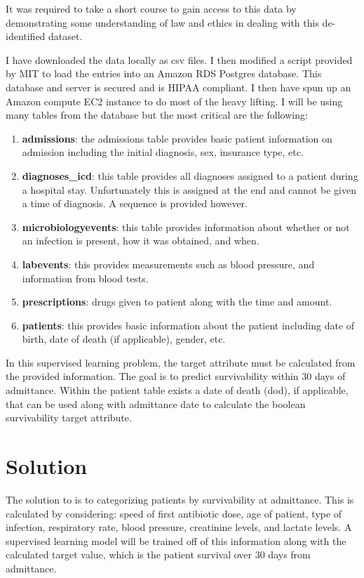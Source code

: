 \documentclass[11pt]{article}
\begin{document}
It was required to take a short course to gain access to this data by demonstrating some understanding of law and ethics in dealing with this de-identified dataset.

I have downloaded the data locally as csv files. I then modified a script provided by MIT to load the entries into an Amazon RDS Postgres database. This database and server is secured and is HIPAA compliant. I then have spun up an Amazon compute EC2 instance to do most of the heavy lifting. I will be using many tables from the database but the most critical are the following:
\begin{enumerate}
\item \textbf{admissions}: the admissions table provides basic patient information on admission including the initial diagnosis, sex, insurance type, etc.
\item \textbf{diagnoses\_icd}: this table provides all diagnoses assigned to a patient during a hospital stay. Unfortunately this is assigned at the end and cannot be given a time of diagnosis. A sequence is provided however.
\item \textbf{microbiologyevents}: this table provides information about whether or not an infection is present, how it was obtained, and when.
\item \textbf{labevents}: this provides measurements such as blood pressure, and information from blood tests.
\item \textbf{prescriptions}: drugs given to patient along with the time and amount.
\item \textbf{patients}: this provides basic information about the patient including date of birth, date of death (if applicable), gender, etc.
\end{enumerate}

In this supervised learning problem, the target attribute must be calculated from the provided information. The goal is to predict survivability within 30 days of admittance. Within the patient table exists a date of death (dod), if applicable, that can be used along with admittance date to calculate the boolean survivability target attribute.


\section{Solution}
The solution to is to categorizing patients by survivability at admittance. This is calculated by considering: speed of first antibiotic dose, age of patient, type of infection, respiratory rate, blood pressure, creatinine levels, and lactate levels. A supervised learning model will be trained off of this information along with the calculated target value, which is the patient survival over 30 days from admittance.
\end{document}
